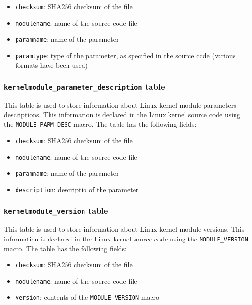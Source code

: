 \documentclass[10pt,a4paper]{article}
\begin{document}
\begin{itemize}
\item \texttt{checksum}: SHA256 checksum of the file
\item \texttt{modulename}: name of the source code file
\item \texttt{paramname}: name of the parameter
\item \texttt{paramtype}: type of the parameter, as specified in the source
code (various formats have been used)
\end{itemize}

\subsubsection{\texttt{kernelmodule\_parameter\_description} table}

This table is used to store information about Linux kernel module parameters
descriptions.  This information is declared in the Linux kernel source code
using the \texttt{MODULE\_PARM\_DESC} macro. The table has the following fields:

\begin{itemize}
\item \texttt{checksum}: SHA256 checksum of the file
\item \texttt{modulename}: name of the source code file
\item \texttt{paramname}: name of the parameter
\item \texttt{description}: descriptio of the parameter
\end{itemize}

\subsubsection{\texttt{kernelmodule\_version} table}

This table is used to store information about Linux kernel module versions.
This information is declared in the Linux kernel source code using the
\texttt{MODULE\_VERSION} macro. The table has the following fields:

\begin{itemize}
\item \texttt{checksum}: SHA256 checksum of the file
\item \texttt{modulename}: name of the source code file
\item \texttt{version}: contents of the \texttt{MODULE\_VERSION} macro
\end{itemize}
\end{document}
